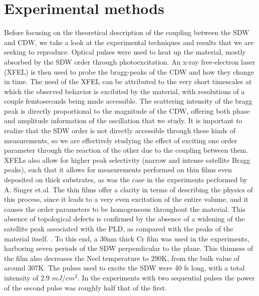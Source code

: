 \section{Experimental methods}
Before focusing on the theoretical description of the coupling between the SDW and CDW, we take a look at the experimental techniques and results that we are seeking to reproduce. Optical pulses were used to heat up the material, mostly absorbed by the SDW order through photoexcitation. An x-ray free-electron laser (XFEL) is then used to probe the bragg-peaks of the CDW and how they change in time. The need of the XFEL can be attributed to the very short timescales at which the observed behavior is excibited by the material, with resolutions of a couple femtoseconds being made accessible.
The scattering intensity of the bragg peak is directly proportional to the magnitude of the CDW, offering both phase and amplitude information of the oscillation that we study. It is important to realize that the SDW order is not directly accessible through these kinds of measurements, so we are effectively studying the effect of exciting one order parameter through the reaction of the other due to the coupling between them.
XFELs also allow for higher peak selectivity (narrow and intense satellite Bragg peaks), such that it allows for measurements performed on thin films even deposited on thick substrates, as was the case in the experiments performed by A. Singer et.al. The thin films offer a clarity in terms of describing the physics of this process, since it leads to a very even excitation of the entire volume, and it causes the order parameters to be homogeneous throughout the material. This absence of topological defects is confirmed by the absence of a widening of the satellite peak associated with the PLD, as compared with the peaks of the material itself. .
To this end, a 30nm thick Cr film was used in the experiments, harboring seven periods of the SDW perpendicular to the plane. This thinness of the film also decreases the Neel temperature to 290K, from the bulk value of around 307K. The pulses used to excite the SDW were 40 fs long, with a total intensity of 2.9 $mJ/cm^2$. In the experiments with two sequential pulses the power of the second pulse was roughly half that of the first.

